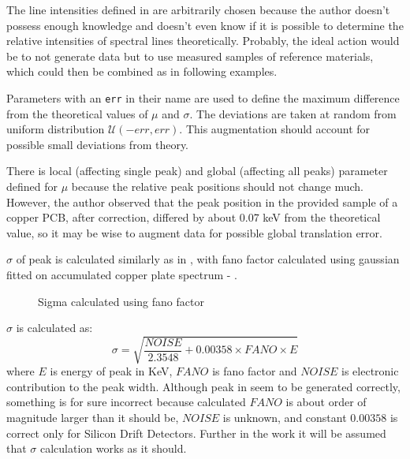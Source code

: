 The line intensities defined in  are arbitrarily chosen because the author doesn't possess enough knowledge and doesn't even know if it is possible to determine the relative intensities of spectral lines theoretically. 
Probably, the ideal action would be to not generate data but to use measured samples of reference materials, which could then be combined as in following examples.

Parameters with an \texttt{err} in their name are used to define the maximum difference from the theoretical values of $\mu$ and $\sigma$. 
The deviations are taken at random from uniform distribution $\mathcal{U}(-err, err)$.
This augmentation should account for possible small deviations from theory. 

There is local (affecting single peak) and global (affecting all peaks) parameter defined for $\mu$ because the relative peak positions should not change much. 
However, the author observed that the peak position in the provided sample of a copper PCB, after correction, differed by about 0.07 keV from the theoretical value, so it may be wise to augment data for possible global translation error.

$\sigma$ of peak is calculated similarly as in \cite{Alfeld2013}, with fano factor calculated using gaussian fitted on accumulated copper plate spectrum - .

\begin{figure}[H] 
  \centering     
   
  \caption{Sigma calculated using fano factor}
  \label{fig:fano-factor}
\end{figure}

$\sigma$ is calculated as: \[\sigma = \sqrt{\frac{NOISE}{2.3548} + 0.00358 \times FANO \times E}\]
where $E$ is energy of peak in KeV, $FANO$ is fano factor and $NOISE$ is electronic contribution to the peak width.
Although peak in  seem to be generated correctly, something is for sure incorrect because calculated $FANO$ is about order of magnitude larger than it should be, $NOISE$ is unknown, and constant $0.00358$ is correct only for Silicon Drift Detectors.
Further in the work it will be assumed that $\sigma$ calculation works as it should.

